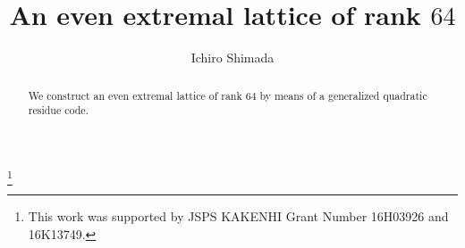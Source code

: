 \documentclass{amsart}
\begin{document}
\title[An even extremal lattice of rank $64$]%
{An even extremal lattice of rank $64$}
\author{Ichiro Shimada}
\address{Department of Mathematics, 
Graduate School of Science, 
Hiroshima University,
1-3-1 Kagamiyama, 
Higashi-Hiroshima, 
739-8526 JAPAN}

\thanks{This work was supported by JSPS KAKENHI Grant Number 16H03926 and 16K13749.}



\begin{abstract}
We construct an even extremal lattice of rank  $64$
by means of a generalized  quadratic residue code.
\end{abstract}
\maketitle
\end{document}

